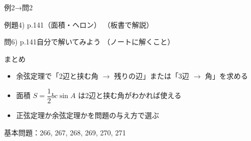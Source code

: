 \documentclass[aspectratio=43,professionalfonts,handout]{beamer}
\begin{document}
\begin{frame}{例2→問2}
  \begin{exampleblock}{例題4) p.141（面積・ヘロン）}
    （板書で解説）
  \end{exampleblock}

  \vfill

  \begin{block}{問6) p.141\quad 自分で解いてみよう}
    （ノートに解くこと）
  \end{block}
\end{frame}

\begin{frame}{まとめ}
  \begin{itemize}
    \item 余弦定理で「2辺と挟む角 $\to$ 残りの辺」または「3辺 $\to$ 角」を求める
    \item 面積 $S = \dfrac{1}{2}bc\sin A$ は2辺と挟む角がわかれば使える
    \item 正弦定理か余弦定理かを問題の与え方で選ぶ
  \end{itemize}

  \vfill
  {\small 基本問題：266, 267, 268, 269, 270, 271}
\end{frame}
\end{document}
